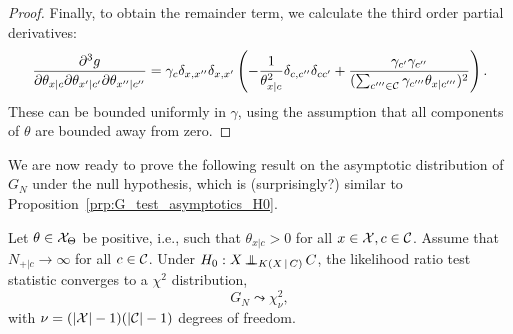 \begin{proof}
Finally, to obtain the remainder term, we calculate the third order partial derivatives:
  $$\frac{\partial^3 g}{\partial \theta_{x|c} \partial \theta_{x'|c'} \partial \theta_{x''|c''}} = 
  \gamma_c \delta_{x,x''} \delta_{x,x'} \left( -\frac{1}{\theta_{x|c}^2} \delta_{c,c''} \delta_{cc'} + \frac{\gamma_{c'}\gamma_{c''} }{(\sum_{c'''\in\mathcal{C}} \gamma_{c'''} \theta_{x|c'''})^2} \right).
  $$
These can be bounded uniformly in $\gamma$, using the assumption that all components of $\theta$ are bounded away from zero.
\end{proof}
We are now ready to prove the following result on the asymptotic distribution of $G_N$ under the null hypothesis, which is (surprisingly?) similar to Proposition~\ref{prp:G_test_asymptotics_H0}.
\begin{Prp}\label{prp:ext_G_test_asymptotics_H0}
  Let $\theta \in \mathcal{X}_\Theta$ be positive, i.e., such that $\theta_{x|c} > 0$ for all $x \in \mathcal{X}, c \in \mathcal{C}$.
  Assume that $N_{+|c} \to \infty$ for all $c \in \mathcal{C}$.
  Under $H_0 : X \operatorname*{\perp\mkern-11mu\perp}_{K(X \operatorname*{|} C)} C$, the likelihood ratio test statistic  converges
  to a $\chi^2$ distribution,
  $$G_N \leadsto \chi^2_\nu,$$
  with $\nu = (|\mathcal{X}| - 1)(|\mathcal{C}| - 1)$ degrees of freedom.
\end{Prp}

